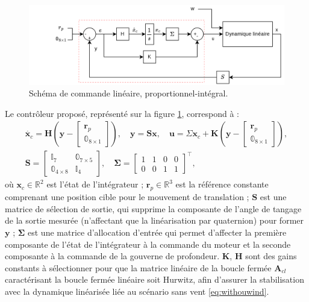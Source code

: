 \begin{figure}[ht!]
    \centering
    \includegraphics[trim=5cm 0cm 0cm 0cm,clip,width=0.8\columnwidth]{figures/commande_integrale_ACA.png}
    \caption{Schéma de commande linéaire, proportionnel-intégral.}
    \label{fig:commande_int3DOF}
\end{figure}
Le contrôleur proposé, représenté sur la figure \ref{fig:commande_int3DOF}, correspond à :
\begin{subequations}
    \begin{align}
        \label{eq:ctrl3dof}
        \dot{\boldsymbol{x}_{c}} = \boldsymbol{H}(\boldsymbol{y}-\begin{bmatrix}\boldsymbol{r}_{p}\\\mathbb{0}_{8\times 1} \end{bmatrix}), \quad
        \boldsymbol{y} = \boldsymbol{S} \boldsymbol{x},\quad
        \boldsymbol{u} = \Sigma \boldsymbol{x}_{c} + \boldsymbol{K}(\boldsymbol{y}-\begin{bmatrix}\boldsymbol{r}_{p}\\\mathbb{0}_{8\times 1} \end{bmatrix}),\\
        \boldsymbol{S} =\begin{bmatrix} \mathbb{I}_{7} &  \mathbb{0}_{7\times 5} \\
         \mathbb{0}_{4\times 8} &  \mathbb{I}_{4}
          \end{bmatrix}, \quad
          \boldsymbol{\Sigma} = \begin{bmatrix} 1 & 1 & 0 & 0\\ 0 & 0 & 1 & 1\end{bmatrix}^\top,
    \end{align}
\end{subequations}
où $\boldsymbol{x}_{c} \in \mathbb{R}^{2}$ est l'état de l'intégrateur ; $\boldsymbol{r}_{p} \in \mathbb{R}^{3}$ est la référence constante comprenant une position cible pour le mouvement de translation ; $\boldsymbol{S}$ est une matrice de sélection de sortie, qui supprime la composante de l'angle de tangage de la sortie mesurée (n'affectant que la linéarisation par quaternion) pour former $\boldsymbol{y}$ ; $\boldsymbol{\Sigma}$ est une matrice d'allocation d'entrée qui permet d'affecter la première composante de l'état de l'intégrateur à la commande du moteur et la seconde composante à la commande de la gouverne de profondeur. $\boldsymbol{K}$, $\boldsymbol{H}$ sont des gains constants à sélectionner pour que la matrice linéaire de la boucle fermée $\boldsymbol{A}_{cl}$ caractérisant la boucle fermée linéaire soit Hurwitz, afin d'assurer la stabilisation avec la dynamique linéarisée liée au scénario sans vent \eqref{eq:withouwind}.


